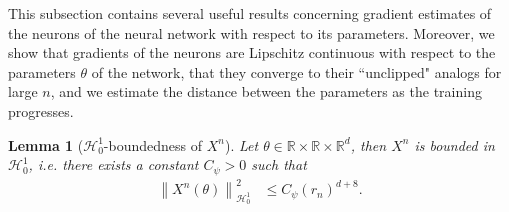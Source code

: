 \documentclass[11pt,a4paper,reqno]{amsart}
\numberwithin{equation}{section}
\theoremstyle{plain}
\newtheorem{lemma}[theorem]{Lemma}
\theoremstyle{definition}
\def\red{\color{red}}
\newcommand{\cH}{\mathcal{H}}
\newcommand{\R}{\mathbb{R}}
\newcommand{\norm}[1]{\left\|#1 \right\|} %
\newcommand{\abs}[1]{\left|#1\right|} %
\begin{document}
This subsection contains several useful results concerning gradient estimates of the neurons of the neural network with respect to its parameters.
Moreover, we show that gradients of the neurons are Lipschitz continuous with respect to the parameters $\theta$ of the network, that they converge to their ``unclipped" analogs for large $n$, and we estimate the distance between the parameters as the training progresses.

\begin{lemma}[$\cH_0^1$-boundedness of $X^n$]
\label{lem:boundXN}
Let $\theta \in \R \times \R \times \R^d$, then $X^n$ is bounded in $\cH_0^1$, \emph{i.e.} there exists a constant $C_\psi>0$ such that
\begin{align*}
\norm{X^n(\theta)}^2_{\cH_0^1} &\le C_\psi \left(r_n\right)^{d+8}.
\end{align*}
\end{lemma}
\end{document}
